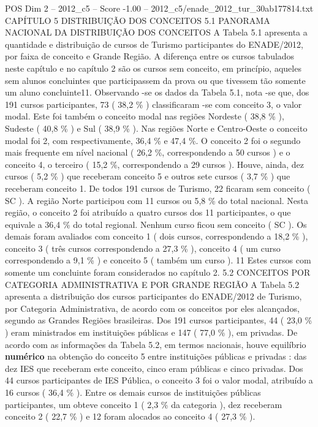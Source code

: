 \begin{textsample}{POS Dim 2 – 2012\_c5 – Score -1.00 – 2012\_c5/enade\_2012\_tur\_30ab177814.txt}  \label{ex:f2_pos_356}
CAPÍTULO 5 DISTRIBUIÇÃO DOS CONCEITOS 5.1 PANORAMA NACIONAL DA DISTRIBUIÇÃO DOS CONCEITOS A Tabela 5.1 apresenta a quantidade e distribuição de cursos de Turismo participantes do ENADE/2012, por faixa de conceito e Grande Região.
A diferença entre os cursos tabulados neste capítulo e no capítulo 2 são os cursos sem conceito, em princípio, aqueles sem alunos concluintes que participassem da prova ou que tivessem tão somente um aluno concluinte11.
Observando -se os dados da Tabela 5.1, nota -se que, dos 191 cursos participantes, 73 ( 38,2 \% ) classificaram -se com conceito 3, o valor modal.
Este foi também o conceito modal nas regiões Nordeste ( 38,8 \% ), Sudeste ( 40,8 \% ) e Sul ( 38,9 \% ).
Nas regiões Norte e Centro-Oeste o conceito modal foi 2, com respectivamente, 36,4 \% e 47,4 \%.
O conceito 2 foi o segundo mais frequente em nível nacional ( 26,2 \%, correspondendo a 50 cursos ) e o conceito 4, o terceiro ( 15,2 \%, correspondendo a 29 cursos ).
Houve, ainda, dez cursos ( 5,2 \% ) que receberam conceito 5 e outros sete cursos ( 3,7 \% ) que receberam conceito 1.
De todos 191 cursos de Turismo, 22 ficaram sem conceito ( SC ).
A região Norte participou com 11 cursos ou 5,8 \% do total nacional.
Nesta região, o conceito 2 foi atribuído a quatro cursos dos 11 participantes, o que equivale a 36,4 \% do total regional.
Nenhum curso ficou sem conceito ( SC ).
Os demais foram avaliados com conceito 1 ( dois cursos, correspondendo a 18,2 \% ), conceito 3 ( três cursos correspondendo a 27,3 \% ), conceito 4 ( um curso correspondendo a 9,1 \% ) e conceito 5 ( também um curso ). 11 Estes cursos com somente um concluinte foram considerados no capítulo 2. 5.2 CONCEITOS POR CATEGORIA ADMINISTRATIVA E POR GRANDE REGIÃO A Tabela 5.2 apresenta a distribuição dos cursos participantes do ENADE/2012 de Turismo, por Categoria Administrativa, de acordo com os conceitos por eles alcançados, segundo as Grandes Regiões brasileiras.
Dos 191 cursos participantes, 44 ( 23,0 \% ) eram ministrados em instituições públicas e 147 ( 77,0 \% ), em privadas.
De acordo com as informações da Tabela 5.2, em termos nacionais, houve equilíbrio \textbf{numérico} na obtenção do conceito 5 entre instituições públicas e privadas : das dez IES que receberam este conceito, cinco eram públicas e cinco privadas.
Dos 44 cursos participantes de IES Pública, o conceito 3 foi o valor modal, atribuído a 16 cursos ( 36,4 \% ).
Entre os demais cursos de instituições públicas participantes, um obteve conceito 1 ( 2,3 \% da categoria ), dez receberam conceito 2 ( 22,7 \% ) e 12 foram alocados ao conceito 4 ( 27,3 \% ).

\end{textsample}
